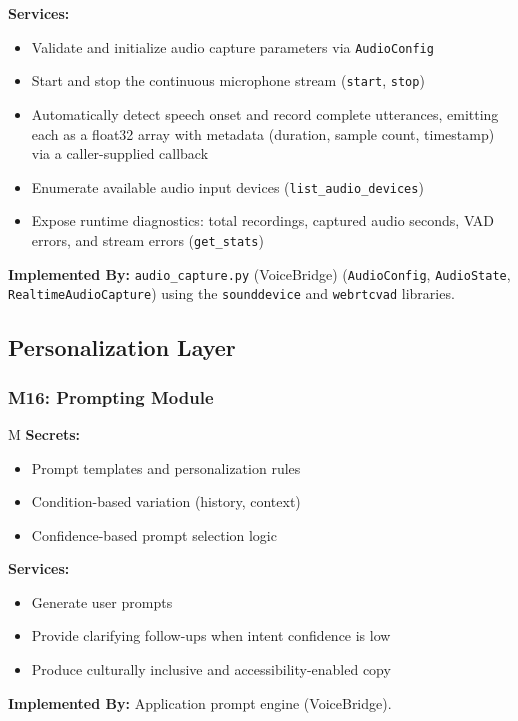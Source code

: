 \documentclass[12pt, titlepage]{article}
\newcounter{mnum}
\newcommand{\mthemnum}{M\themnum}
\begin{document}
\textbf{Services:}
\begin{itemize}
  \item Validate and initialize audio capture parameters via \texttt{AudioConfig}
  \item Start and stop the continuous microphone stream (\texttt{start}, \texttt{stop})
  \item Automatically detect speech onset and record complete utterances, emitting each as a float32 array with metadata (duration, sample count, timestamp) via a caller-supplied callback
  \item Enumerate available audio input devices (\texttt{list\_audio\_devices})
  \item Expose runtime diagnostics: total recordings, captured audio seconds, VAD errors, and stream errors (\texttt{get\_stats})
\end{itemize}

\textbf{Implemented By:} \texttt{audio\_capture.py} (VoiceBridge) (\texttt{AudioConfig}, \texttt{AudioState}, \texttt{RealtimeAudioCapture}) using the \texttt{sounddevice} and \texttt{webrtcvad} libraries.

\subsection*{Personalization Layer}
\subsubsection*{M16: Prompting Module} \mthemnum\label{M16}
\textbf{Secrets:} 
\begin{itemize}
  \item Prompt templates and personalization rules
  \item Condition-based variation (history, context)
  \item Confidence-based prompt selection logic
\end{itemize}
\textbf{Services:} 
\begin{itemize}
  \item Generate user prompts
  \item Provide clarifying follow-ups when intent confidence is low
  \item Produce culturally inclusive and accessibility-enabled copy
\end{itemize}
\textbf{Implemented By:} Application prompt engine (VoiceBridge).

\medskip
\end{document}
